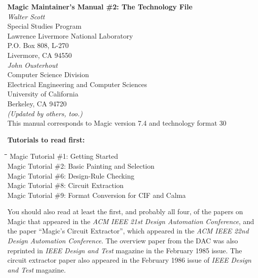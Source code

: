 \documentclass[letterpaper,twoside,12pt]{article}
\def\hinch{\hspace*{0.5in}}
\def\starti{\begin{center}\begin{tabbing}\hinch\=\hinch\=\hinch\=\hinch\=\kill}
\def\endi{\end{tabbing}\end{center}}
\def\mytitle{Magic Maintainer's Manual \#2: The Technology File}
\begin{document}
\makeatletter
\newcommand{\ps@magic}{%
	\renewcommand{\@oddhead}{\mytitle\hfil\today}%
	\renewcommand{\@evenhead}{\today\hfil\mytitle}%
	\renewcommand{\@evenfoot}{\hfil\textrm{--{\thepage}--}\hfil}%
	\renewcommand{\@oddfoot}{\@evenfoot}}
\newcommand{\ps@mplain}{%
	\renewcommand{\@oddhead}{}%
	\renewcommand{\@evenhead}{}%
	\renewcommand{\@evenfoot}{\hfil\textrm{--{\thepage}--}\hfil}%
	\renewcommand{\@oddfoot}{\@evenfoot}}
\makeatother
\pagestyle{magic}
\thispagestyle{mplain}


\begin{center}
  {\bfseries \Large \mytitle} \\
  \vspace*{0.5in}
  {\itshape Walter Scott} \\
  \vspace*{0.25in}
   Special Studies Program \\
   Lawrence Livermore National Laboratory \\
   P.O. Box 808, L-270 \\
   Livermore, CA  94550 \\
  \vspace*{0.25in}
  {\itshape John Ousterhout} \\
  \vspace*{0.25in}
   Computer Science Division \\
   Electrical Engineering and Computer Sciences \\
   University of California \\
   Berkeley, CA  94720 \\
  \vspace*{0.25in}
  {\itshape (Updated by others, too.)} \\
  \vspace*{0.25in}
  This manual corresponds to Magic version 7.4
  and technology format 30
\end{center}
\vspace*{0.25in}

{\noindent\bfseries\large Tutorials to read first:}
\starti
   \> Magic Tutorial \#1: Getting Started \\
   \> Magic Tutorial \#2: Basic Painting and Selection \\
   \> Magic Tutorial \#6: Design-Rule Checking \\
   \> Magic Tutorial \#8: Circuit Extraction \\
   \> Magic Tutorial \#9: Format Conversion for CIF and Calma
\endi
\noindent You should also read at least the first, and probably all four,
of the papers on Magic that appeared in the {\itshape ACM IEEE 21st
Design Automation Conference}, and the paper ``Magic's Circuit Extractor'',
which appeared in the {\itshape ACM IEEE 22nd Design
Automation Conference}.  The overview paper from the
DAC was also reprinted in {\itshape IEEE Design and Test} magazine in
the February 1985 issue.
The circuit extractor paper also appeared in the
February 1986 issue of {\itshape IEEE Design and Test} magazine. 
\end{document}
